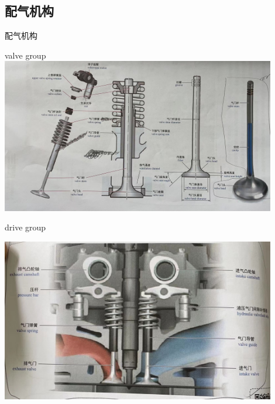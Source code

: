 \subsection{配气机构}
\begin{frame}{配气机构}
	\begin{block}{valve group}
		\includegraphics[width=0.9\textwidth]{2-16}
	\end{block}
\end{frame}
\begin{frame}
	\begin{block}{drive group}
		\begin{center}
			\includegraphics[width=0.9\textwidth]{2-17}
		\end{center}
	\end{block}
\end{frame}
